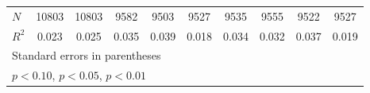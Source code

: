 \begin{table}[htbp]
\begin{tabular}{l*{9}{c}}
\(N\)       &       10803         &       10803         &        9582         &        9503         &        9527         &        9535         &        9555         &        9522         &        9527         \\
\(R^{2}\)   &       0.023         &       0.025         &       0.035         &       0.039         &       0.018         &       0.034         &       0.032         &       0.037         &       0.019         \\
\hline\hline
\multicolumn{10}{l}{\footnotesize Standard errors in parentheses}\\
\multicolumn{10}{l}{\footnotesize \sym{*} \(p<0.10\), \sym{**} \(p<0.05\), \sym{***} \(p<0.01\)}\\
\end{tabular}
\end{table}
